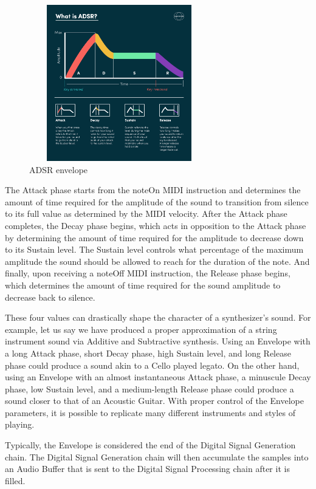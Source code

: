 \documentclass[a4paper,12pt]{report}
\begin{document}
\begin{figure}[h]
    \centering
    \includegraphics[width=0.7\textwidth,height=6.8cm]{ADSRExplained.jpg}
    \caption{ADSR envelope}
    \label{fig:ADSRExplained}
\end{figure}

The Attack phase starts from the noteOn MIDI instruction and determines the amount of time required for the amplitude of the sound to transition from silence to its full value as determined by the MIDI velocity. After the Attack phase completes, the Decay phase begins, which acts in opposition to the Attack phase by determining the amount of time required for the amplitude to decrease down to its Sustain level. The Sustain level controls what percentage of the maximum amplitude the sound should be allowed to reach for the duration of the note. And finally, upon receiving a noteOff MIDI instruction, the Release phase begins, which determines the amount of time required for the sound amplitude to decrease back to silence.

These four values can drastically shape the character of a synthesizer's sound. For example, let us say we have produced a proper approximation of a string instrument sound via Additive and Subtractive synthesis. Using an Envelope with a long Attack phase, short Decay phase, high Sustain level, and long Release phase could produce a sound akin to a Cello played legato. On the other hand, using an Envelope with an almost instantaneous Attack phase, a minuscule Decay phase, low Sustain level, and a medium-length Release phase could produce a sound closer to that of an Acoustic Guitar. With proper control of the Envelope parameters, it is possible to replicate many different instruments and styles of playing.

Typically, the Envelope is considered the end of the Digital Signal Generation chain. The Digital Signal Generation chain will then accumulate the samples into an Audio Buffer that is sent to the Digital Signal Processing chain after it is filled.
\end{document}
